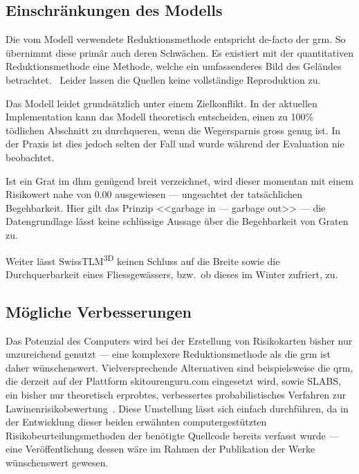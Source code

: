 \clearpage

\subsection{Einschränkungen des Modells}
Die vom Modell verwendete Reduktionsmethode entspricht de-facto der \gls{grm}. So übernimmt diese primär auch deren Schwächen. Es existiert mit der quantitativen Reduktionsmethode eine Methode, welche ein umfassenderes Bild des Geländes betrachtet.~\cite{qrm}
Leider lassen die Quellen keine vollständige Reproduktion zu.

Das Modell leidet grundsätzlich unter einem Zielkonflikt. In der aktuellen Implementation kann das Modell theoretisch entscheiden, einen zu 100\% tödlichen Abschnitt zu durchqueren, wenn die Wegersparnis gross genug ist. In der Praxis ist dies jedoch selten der Fall und wurde während der Evaluation nie beobachtet.

Ist ein Grat im \acrshort{dhm} genügend breit verzeichnet, wird dieser momentan mit einem Risikowert nahe von $0.00$ ausgewiesen --- ungeachtet der tatsächlichen Begehbarkeit. Hier gilt das Prinzip <<garbage in --- garbage out>> --- die Datengrundlage lässt keine schlüssige Aussage über die Begehbarkeit von Graten zu.

Weiter lässt SwissTLM\textsuperscript{3D} keinen Schluss auf die Breite sowie die Durchquerbarkeit eines Fliessgewässers, bzw.\ ob dieses im Winter zufriert, zu.

\subsection{Mögliche Verbesserungen}\label{sec:improvements}

Das Potenzial des Computers wird bei der Erstellung von Risikokarten bisher nur unzureichend genutzt --- eine komplexere Reduktionsmethode als die \gls{grm} ist daher wünschenswert. Vielversprechende Alternativen sind beispielsweise die \gls{qrm}, die derzeit auf der Plattform skitourenguru.com eingesetzt wird, sowie SLABS, ein bisher nur theoretisch erprobtes, verbessertes probabilistisches Verfahren zur Lawinenrisikobewertung~\cite{qrm}\cite{slabs}. Diese Umstellung lässt sich einfach durchführen, da in der Entwicklung dieser beiden erwähnten computergestützten Risikobeurteilungsmethoden der benötigte Quellcode bereits verfasst wurde --- eine Veröffentlichung dessen wäre im Rahmen der Publikation der Werke wünschenswert gewesen.

